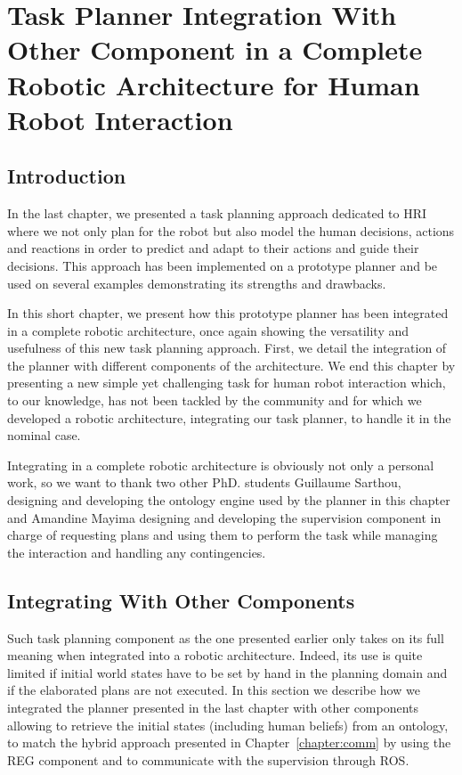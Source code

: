 \documentclass[a4paper,11pt,twoside]{StyleThese}
\begin{document}
\setcounter{chapter}{4} %
\dominitoc
\faketableofcontents
\fi

\chapter{Task Planner Integration With Other Component in a Complete Robotic Architecture for Human Robot Interaction}
\label{chapter:integration}
\minitoc

\section{Introduction}
In the last chapter, we presented a task planning approach dedicated to HRI where we not only plan for the robot but also model the human decisions, actions and reactions in order to predict and adapt to their actions and guide their decisions. This approach has been implemented on a prototype planner and be used on several examples demonstrating its strengths and drawbacks.

In this short chapter, we present how this prototype planner has been integrated in a complete robotic architecture, once again showing the versatility and usefulness of this new task planning approach. First, we detail the integration of the planner with different components of the architecture. We end this chapter by presenting a new simple yet challenging task for human robot interaction which, to our knowledge, has not been tackled by the community and for which we developed a robotic architecture, integrating our task planner, to handle it in the nominal case.

Integrating in a complete robotic architecture is obviously not only a personal work, so we want to thank two other PhD. students Guillaume Sarthou, designing and developing the ontology engine used by the planner in this chapter and Amandine Mayima designing and developing the supervision component in charge of requesting plans and using them to perform the task while managing the interaction and handling any contingencies.

\section{Integrating With Other Components}
\label{sec:chap5integratingwithothers}

Such task planning component as the one presented earlier only takes on its full meaning when integrated into a robotic architecture. Indeed, its use is quite limited if initial world states have to be set by hand in the planning domain and if the elaborated plans are not executed. In this section we describe how we integrated the planner presented in the last chapter with other components allowing to retrieve the initial states (including human beliefs) from an ontology, to match the hybrid approach presented in Chapter~\ref{chapter:comm} by using the REG component and to communicate with the supervision through ROS.
\end{document}
